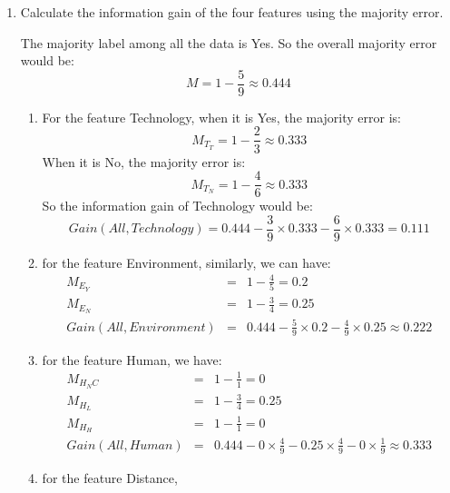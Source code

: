 \documentclass{article}[12pt]
\begin{document}
		\begin{enumerate}
			\item Calculate the information gain of the four features using the majority error.
			\begin{enumerate}
				The majority label among all the data is Yes. So the overall majority error would be:
				\begin{displaymath}
					M = 1 - \frac{5}{9} \approx 0.444
				\end{displaymath}
				\begin{enumerate}
					\item For the feature Technology, when it is Yes, the majority error is:
						\begin{displaymath}
							M_{T_T} = 1 - \frac{2}{3} \approx 0.333
						\end{displaymath}
						When it is No, the majority error is:
						\begin{displaymath}
							M_{T_N} = 1 - \frac{4}{6} \approx 0.333
						\end{displaymath}
						So the information gain of Technology would be:
						\begin{displaymath}
							Gain(All, Technology) = 0.444 - \frac{3}{9}\times 0.333 - \frac{6}{9} \times 0.333 = 0.111
						\end{displaymath}
					\item for the feature Environment, similarly, we can have:
						\begin{eqnarray}
							M_{E_Y} &=& 1 - \frac{4}{5} = 0.2\nonumber \\
							M_{E_N} &=& 1 - \frac{3}{4} = 0.25\nonumber \\
							Gain(All, Environment) &=& 0.444 - \frac{5}{9} \times 0.2 - \frac{4}{9} \times 0.25 \approx 0.222\nonumber 
						\end{eqnarray}
					\item for the feature Human, we have:
						\begin{eqnarray}
							M_{H_NC} &=& 1 - \frac{1}{1} = 0\nonumber \\
							M_{H_L} &=& 1 - \frac{3}{4} = 0.25\nonumber \\
							M_{H_H} &=& 1 - \frac{1}{1} = 0\nonumber \\
							Gain(All, Human) &=& 0.444 - 0 \times \frac{4}{9} - 0.25 \times \frac{4}{9} - 0 \times \frac{1}{9} \approx 0.333\nonumber 
						\end{eqnarray}
					\item for the feature Distance,
						\begin{eqnarray}

\end{eqnarray}
\end{enumerate}
\end{enumerate}
\end{enumerate}
\end{document}
